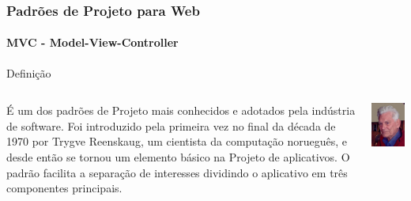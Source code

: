\documentclass[
	9pt, %
	t, %
]{beamer}
\begin{document}
\begin{frame}
	\frametitle{Padrões de Projeto para Web}
	\framesubtitle{MVC - Model-View-Controller}

	\begin{block}{Definição}
	\begin{columns}[c] %
			\begin{column}{0.8\textwidth} %
				É um dos padrões de Projeto mais conhecidos e adotados pela indústria de software. Foi introduzido pela primeira vez no final da década de 1970 por Trygve Reenskaug, um cientista da computação norueguês, e desde então se tornou um elemento básico na Projeto de aplicativos. O padrão facilita a separação de interesses dividindo o aplicativo em três componentes principais.
			\end{column}

			\begin{column}{0.2\textwidth} %
				\includegraphics[width=0.9\linewidth]{Images/reenskaug.jpg}
			\end{column}
		\end{columns}
	\end{block}

\end{frame}
\end{document}
